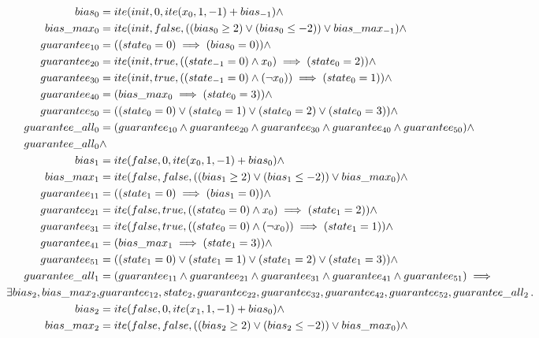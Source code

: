 \begin{equation}
\begin{aligned}
   bias_0&=ite(init, 0, ite(x_0, 1, -1)+bias_{-1}) \land \\
    bias\_max_0&=ite(init, false, ((bias_0\ge 2)\lor (bias_0\le -2))\lor bias\_max_{-1})\land \\
    guarantee_{10}&=((state_0=0)\implies(bias_0=0))\land \\
    guarantee_{20}&=ite(init, true, ((state_{-1}=0)\land x_0)\implies(state_0=2))\land \\
    guarantee_{30}&=ite(init, true, ((state_{-1}=0)\land (\neg x_0))\implies(state_0=1))\land \\
    guarantee_{40}&=(bias\_max_0\implies(state_0=3))\land \\
    guarantee_{50}&=((state_0=0) \lor (state_0=1) \lor (state_0=2) \lor (state_0=3))\land \\
    guarantee\_all_0&=(guarantee_{10}\land guarantee_{20}\land guarantee_{30}\land guarantee_{40} \land guarantee_{50})  \land \\
    guarantee\_all_0 &\land \\
    bias_1&=ite(false, 0, ite(x_0, 1, -1)+bias_0)\land \\
    bias\_max_1&=ite(false, false, ((bias_1\ge 2)\lor (bias_1\le-2))\lor bias\_max_0)\land \\
    guarantee_{11}&=((state_1=0)\implies(bias_1=0))\land \\
    guarantee_{21}&=ite(false, true, ((state_0=0)\land x_0)\implies(state_1=2))\land \\
    guarantee_{31}&=ite(false, true, ((state_0=0)\land (\neg x_0))\implies(state_1=1))\land \\
    guarantee_{41}&=(bias\_max_1\implies(state_1=3))\land \\
    guarantee_{51}&=((state_1=0) \lor (state_1=1) \lor (state_1=2) \lor (state_1=3))\land \\
    guarantee\_all_1&=(guarantee_{11}\land guarantee_{21}\land guarantee_{31}\land guarantee_{41} \land guarantee_{51})
\implies \\
\exists bias_2, bias\_max_2, &guarantee_{12}, state_2, guarantee_{22}, guarantee_{32}, guarantee_{42}, guarantee_{52}, guarantee\_all_2 \such  \\
  bias_2&=ite(false, 0, ite(x_1, 1, -1)+bias_0) \land\\
  bias\_max_2&=ite(false, false, ((bias_2\ge 2) \lor (bias_2\le -2)) \lor bias\_max_0) \land\\

\end{aligned}
\end{equation}
